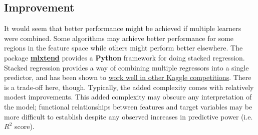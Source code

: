 \documentclass[12pt]{article}
\newcommand\beq{\begin{eqnarray*}}
\newcommand\eeq{\end{eqnarray*}}
\theoremstyle{plain} %
\theoremstyle{definition} %
\theoremstyle{remark} %
\begin{document}
\subsection*{Improvement}
\indent \par It would seem that better performance might be achieved if multiple learners were combined.  Some algorithms may achieve better performance for some regions in the feature space while others might perform better elsewhere.  The package \href{https://github.com/rasbt/mlxtend}{\textbf{mlxtend}} provides a \textbf{Python} framework for doing stacked regression.  Stacked regression provides a way of combining multiple regressors into a single predictor, and has been shown to \href{http://blog.kaggle.com/2016/12/27/a-kagglers-guide-to-model-stacking-in-practice/}{work well in other Kaggle competitions}.  There is a trade-off here, though.  Typically, the added complexity comes with relatively modest improvements.  This added complexity may obscure any interpretation of the model; functional relationships between features and target variables may be more difficult to establish despite any observed increases in predictive power (i.e. $R^2$ score).

\end{document}
